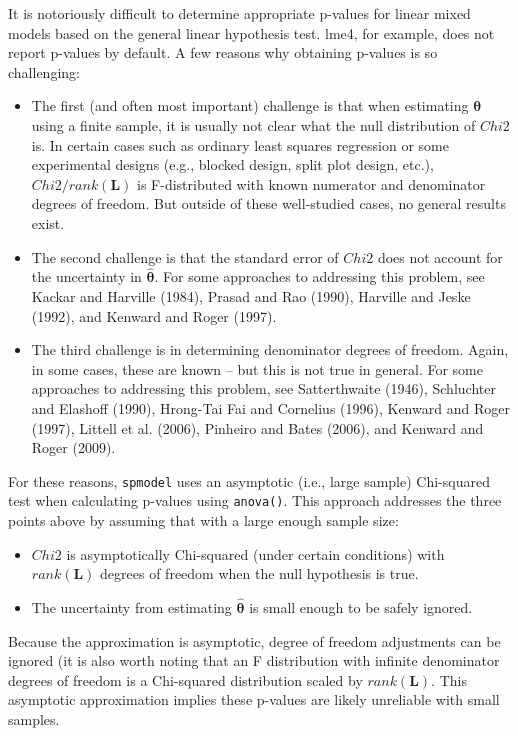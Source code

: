\documentclass{article}
\providecommand{\tightlist}{%
  \setlength{\itemsep}{0pt}\setlength{\parskip}{0pt}}
\begin{document}
It is notoriously difficult to determine appropriate p-values for linear
mixed models based on the general linear hypothesis test. lme4, for
example, does not report p-values by default. A few reasons why
obtaining p-values is so challenging:

\begin{itemize}
\tightlist
\item
  The first (and often most important) challenge is that when estimating
  \(\boldsymbol{\theta}\) using a finite sample, it is usually not clear
  what the null distribution of \(Chi2\) is. In certain cases such as
  ordinary least squares regression or some experimental designs (e.g.,
  blocked design, split plot design, etc.), \(Chi2 / rank(\mathbf{L})\)
  is F-distributed with known numerator and denominator degrees of
  freedom. But outside of these well-studied cases, no general results
  exist.
\item
  The second challenge is that the standard error of \(Chi2\) does not
  account for the uncertainty in \(\boldsymbol{\hat{\theta}}\). For some
  approaches to addressing this problem, see Kackar and Harville (1984),
  Prasad and Rao (1990), Harville and Jeske (1992), and Kenward and
  Roger (1997).
\item
  The third challenge is in determining denominator degrees of freedom.
  Again, in some cases, these are known -- but this is not true in
  general. For some approaches to addressing this problem, see
  Satterthwaite (1946), Schluchter and Elashoff (1990), Hrong-Tai Fai
  and Cornelius (1996), Kenward and Roger (1997), Littell et al. (2006),
  Pinheiro and Bates (2006), and Kenward and Roger (2009).
\end{itemize}

For these reasons, \texttt{spmodel} uses an asymptotic (i.e., large
sample) Chi-squared test when calculating p-values using
\texttt{anova()}. This approach addresses the three points above by
assuming that with a large enough sample size:

\begin{itemize}
\tightlist
\item
  \(Chi2\) is asymptotically Chi-squared (under certain conditions) with
  \(rank(\mathbf{L})\) degrees of freedom when the null hypothesis is
  true.
\item
  The uncertainty from estimating \(\boldsymbol{\hat{\theta}}\) is small
  enough to be safely ignored.
\end{itemize}

Because the approximation is asymptotic, degree of freedom adjustments
can be ignored (it is also worth noting that an F distribution with
infinite denominator degrees of freedom is a Chi-squared distribution
scaled by \(rank(\mathbf{L})\). This asymptotic approximation implies
these p-values are likely unreliable with small samples.
\end{document}
